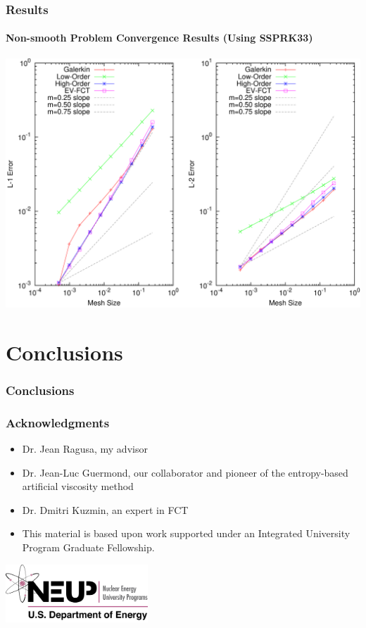 \documentclass{beamer}
\begin{document}
\begin{frame}
\frametitle{Results}
\framesubtitle{Non-smooth Problem Convergence Results (Using SSPRK33)}

\includegraphics[width=\textwidth]{./figures/convergence_absorber_SSPRK33.pdf}

\end{frame}
\section{Conclusions}
\begin{frame}
\frametitle{Conclusions}


\end{frame}
\begin{frame}
\frametitle{Acknowledgments}

\begin{itemize}
   \item Dr. Jean Ragusa, my advisor
   \item Dr. Jean-Luc Guermond, our collaborator and pioneer of the entropy-based
      artificial viscosity method
   \item Dr. Dmitri Kuzmin, an expert in FCT
\end{itemize}
\begin{itemize}
   \item This material is based upon work supported under an Integrated University
      Program Graduate Fellowship.
\end{itemize}

\begin{center}
   \includegraphics[width=0.4\textwidth]{./figures/NEUP_Final_Logo_Version-09.jpg}
\end{center}
\end{frame}
\end{document}

